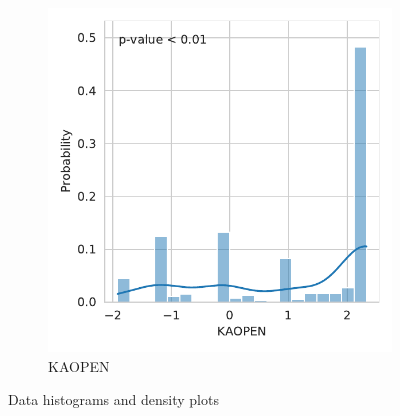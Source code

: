 \documentclass[12pt,a4paper]{article}
\begin{document}
\begin{figure}[htbp]\ContinuedFloat
\centering
\begin{subfigure}{0.45\textwidth}
\includegraphics[width=\textwidth]{./plots/dis/distplot_KAOPEN.pdf}
\caption{KAOPEN}
\end{subfigure}
\caption[]{Data histograms and density plots}
\end{figure}




\FloatBarrier
\end{document}
